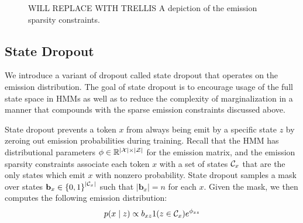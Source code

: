 \documentclass[11pt,a4paper]{article}
\begin{document}
\begin{figure}[t]
\begin{center}
\end{center}
\caption{
\label{fig:trellis}
{\color{red} WILL REPLACE WITH TRELLIS}
A depiction of the emission sparsity constraints.
}
\end{figure}

\subsection{State Dropout}
We introduce a variant of dropout called state dropout that operates on the
emission distribution.
The goal of state dropout is to encourage usage of the full state space in HMMs
as well as to reduce the complexity of marginalization in a manner
that compounds with the sparse emission constraints discussed above.

State dropout prevents a token $x$ from always being emit by a specific state $z$
by zeroing out emission probabilities during training.
Recall that the HMM has distributional parameters
$\phi \in \mathbb{R}^{|\mathcal{X}|\times|\mathcal{Z}|}$ for the emission matrix,
and the emission sparsity constraints associate each token $x$
with a set of states $\mathcal{C}_x$ that are the only states which 
emit $x$ with nonzero probability.
State dropout samples a mask over states $\mathbf{b}_x \in \left\{0,1\right\}^{|\mathcal{C}_x|}$
such that $|\mathbf{b}_x| = n$ for each $x$.
Given the mask, we then computes the following emission distribution:
\begin{equation}
\label{eqn:state_dropout}
p(x \mid z) \propto b_{xz}1(z \in \mathcal{C}_x)e^{\phi_{xz}}
\end{equation}
\end{document}
